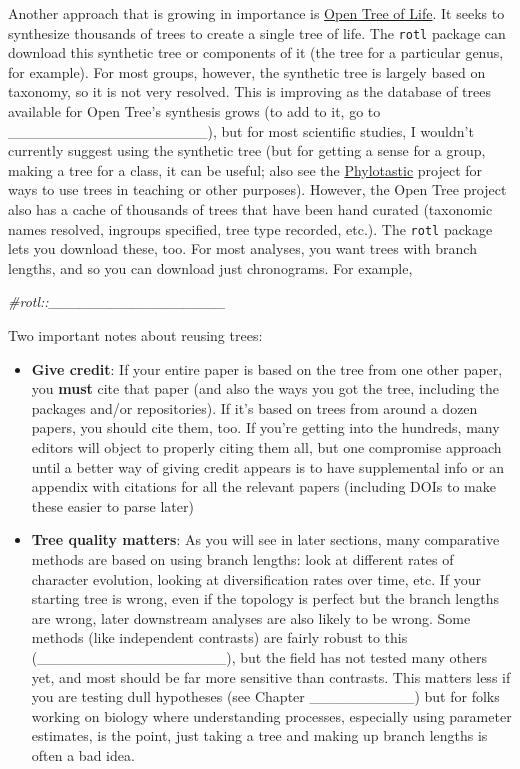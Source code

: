 \documentclass[]{book}
\newenvironment{Shaded}{\begin{snugshade}}{\end{snugshade}}
\newcommand{\CommentTok}[1]{\textcolor[rgb]{0.56,0.35,0.01}{\textit{{#1}}}}
\providecommand{\tightlist}{%
  \setlength{\itemsep}{0pt}\setlength{\parskip}{0pt}}
\theoremstyle{definition}
\theoremstyle{definition}
\theoremstyle{remark}
\begin{document}
Another approach that is growing in importance is
\href{http://otol.org}{Open Tree of Life}. It seeks to synthesize
thousands of trees to create a single tree of life. The \texttt{rotl}
package can download this synthetic tree or components of it (the tree
for a particular genus, for example). For most groups, however, the
synthetic tree is largely based on taxonomy, so it is not very resolved.
This is improving as the database of trees available for Open Tree's
synthesis grows (to add to it, go to
\_\_\_\_\_\_\_\_\_\_\_\_\_\_\_\_\_\_\_), but for most scientific
studies, I wouldn't currently suggest using the synthetic tree (but for
getting a sense for a group, making a tree for a class, it can be
useful; also see the \href{http://www.phylotastic.org}{Phylotastic}
project for ways to use trees in teaching or other purposes). However,
the Open Tree project also has a cache of thousands of trees that have
been hand curated (taxonomic names resolved, ingroups specified, tree
type recorded, etc.). The \texttt{rotl} package lets you download these,
too. For most analyses, you want trees with branch lengths, and so you
can download just chronograms. For example,

\begin{Shaded}
\begin{Highlighting}[]
\CommentTok{#rotl::_________________}
\end{Highlighting}
\end{Shaded}

Two important notes about reusing trees:

\begin{itemize}
\tightlist
\item
  \textbf{Give credit}: If your entire paper is based on the tree from
  one other paper, you \textbf{must} cite that paper (and also the ways
  you got the tree, including the packages and/or repositories). If it's
  based on trees from around a dozen papers, you should cite them, too.
  If you're getting into the hundreds, many editors will object to
  properly citing them all, but one compromise approach until a better
  way of giving credit appears is to have supplemental info or an
  appendix with citations for all the relevant papers (including DOIs to
  make these easier to parse later)
\item
  \textbf{Tree quality matters}: As you will see in later sections, many
  comparative methods are based on using branch lengths: look at
  different rates of character evolution, looking at diversification
  rates over time, etc. If your starting tree is wrong, even if the
  topology is perfect but the branch lengths are wrong, later downstream
  analyses are also likely to be wrong. Some methods (like independent
  contrasts) are fairly robust to this
  (\_\_\_\_\_\_\_\_\_\_\_\_\_\_\_\_\_\_), but the field has not tested
  many others yet, and most should be far more sensitive than contrasts.
  This matters less if you are testing dull hypotheses (see Chapter
  \_\_\_\_\_\_\_\_\_\_) but for folks working on biology where
  understanding processes, especially using parameter estimates, is the
  point, just taking a tree and making up branch lengths is often a bad
  idea.
\end{itemize}
\end{document}
